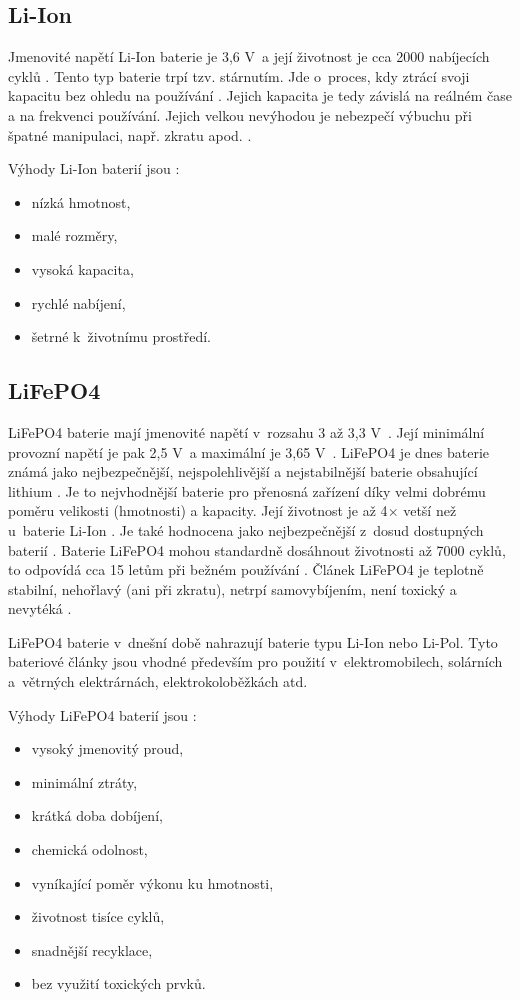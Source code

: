 \subsection{Li-Ion}
Jmenovité napětí Li-Ion baterie je 3,6 V~a její životnost je cca 2000 nabíjecích cyklů \cite{Li-Ion}. Tento typ baterie trpí tzv. stárnutím. Jde o~proces, kdy ztrácí 
svoji kapacitu bez ohledu na používání \cite{Li-Ion}. Jejich kapacita je tedy závislá na reálném čase a na frekvenci používání. Jejich velkou nevýhodou je nebezpečí 
výbuchu při špatné manipulaci, např. zkratu apod. \cite{Li-Ion}. 

Výhody Li-Ion baterií jsou \cite{Li-Ion}:
\begin{itemize}
  \item nízká hmotnost,
  \item malé rozměry,
  \item vysoká kapacita,
  \item rychlé nabíjení,
  \item šetrné k~životnímu prostředí. 
\end{itemize}

\subsection{LiFePO4}
LiFePO4 baterie mají jmenovité napětí v~rozsahu 3 až 3,3 V~\cite{LiFePO4_malina}. Její minimální provozní napětí je pak 2,5 V~a maximální je 3,65 V~\cite{LiFePO4_malina}.
LiFePO4 je dnes baterie známá jako nejbezpečnější, nejspolehlivější a nejstabilnější baterie obsahující lithium \cite{LiFePO4_malina}. Je to nejvhodnější baterie pro 
přenosná zařízení díky velmi dobrému poměru velikosti (hmotnosti) a kapacity. Její životnost je až 4$\times$ vetší než u~baterie Li-Ion \cite{LiFePO4_malina}. Je také hodnocena
jako nejbezpečnější z~dosud dostupných baterií \cite{LiFePO4_malina}. Baterie LiFePO4 mohou standardně dosáhnout životnosti až 7000 cyklů, to odpovídá cca 15 letům při bežném
používání \cite{LiFePO4_malina}. Článek LiFePO4 je teplotně stabilní, nehořlavý (ani při zkratu), netrpí samovybíjením, není toxický a nevytéká \cite{LiFePO4_malina}.

LiFePO4 baterie v~dnešní době nahrazují baterie typu Li-Ion nebo Li-Pol.
Tyto bateriové články jsou vhodné především pro použití v~elektromobilech, solárních a~větrných elektrárnách, elektrokoloběžkách atd. 

Výhody LiFePO4 baterií jsou \cite{LiFePO4_smart}:
\begin{itemize}
  \item vysoký jmenovitý proud,
  \item minimální ztráty,
  \item krátká doba dobíjení,
  \item chemická odolnost,
  \item vyníkající poměr výkonu ku hmotnosti,
  \item životnost tisíce cyklů,
  \item snadnější recyklace,
  \item bez využití toxických prvků.
\end{itemize}


